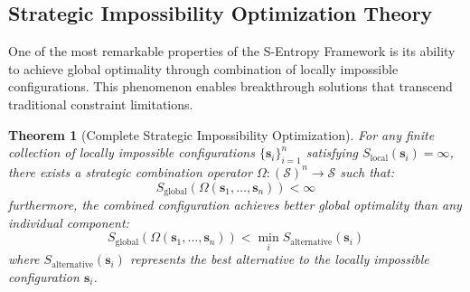 \documentclass[11pt]{article}
\newtheorem{theorem}{Theorem}[section]
\theoremstyle{definition}
\theoremstyle{remark}
\newcommand{\SEntropy}{\mathcal{S}}
\begin{document}
\subsection{Strategic Impossibility Optimization Theory}

One of the most remarkable properties of the S-Entropy Framework is its ability to achieve global optimality through combination of locally impossible configurations. This phenomenon enables breakthrough solutions that transcend traditional constraint limitations.

\begin{theorem}[Complete Strategic Impossibility Optimization]
\label{thm:strategic_impossibility_complete}
For any finite collection of locally impossible configurations $\{\mathbf{s}_i\}_{i=1}^n$ satisfying $S_{\text{local}}(\mathbf{s}_i) = \infty$, there exists a strategic combination operator $\Omega: (\SEntropy)^n \to \SEntropy$ such that:
\begin{equation}
S_{\text{global}}(\Omega(\mathbf{s}_1, \ldots, \mathbf{s}_n)) < \infty
\end{equation}
furthermore, the combined configuration achieves better global optimality than any individual component:
\begin{equation}
S_{\text{global}}(\Omega(\mathbf{s}_1, \ldots, \mathbf{s}_n)) < \min_i S_{\text{alternative}}(\mathbf{s}_i)
\end{equation}
where $S_{\text{alternative}}(\mathbf{s}_i)$ represents the best alternative to the locally impossible configuration $\mathbf{s}_i$.
\end{theorem}
\end{document}
